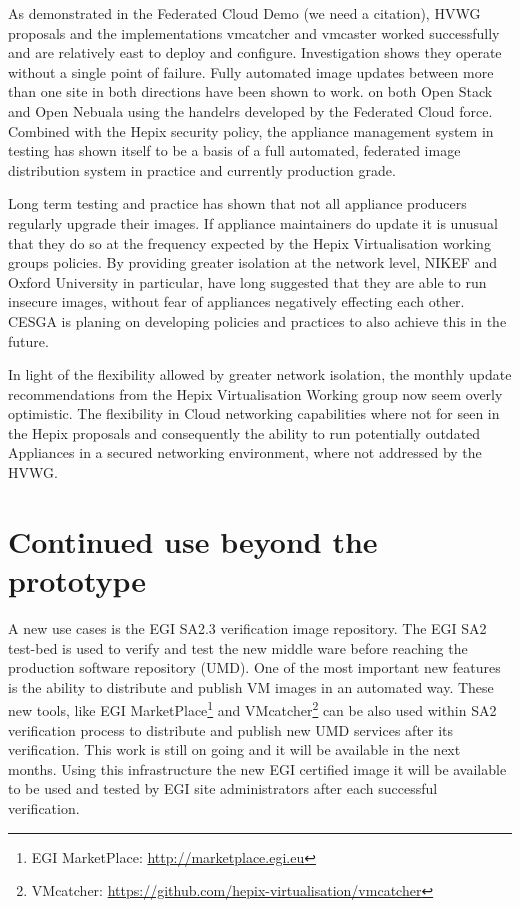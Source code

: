 \documentclass{llncs_Ibergrid2013}
\begin{document}
As demonstrated in the Federated Cloud Demo (we need a citation), HVWG proposals and the implementations vmcatcher and vmcaster worked successfully and are relatively east to deploy and configure. Investigation shows they operate without a single point of failure. Fully automated image updates between more than one site in both directions have been shown to work. on both Open Stack and Open Nebuala using the handelrs developed by the Federated Cloud force. Combined with the Hepix security policy, the appliance management system in testing has shown itself to be a basis of a full automated, federated image distribution system in practice and currently production grade.

Long term testing and practice has shown that not all appliance producers regularly upgrade their images. If appliance maintainers do update it is unusual that they do so at the frequency expected by the Hepix Virtualisation working groups policies. By providing greater isolation at the network level, NIKEF and Oxford University in particular, have long suggested that they are able to run insecure images, without fear of appliances negatively effecting each other. CESGA is planing on developing policies and practices to also achieve this in the future.

In light of the flexibility allowed by greater network isolation, the monthly update recommendations from the Hepix Virtualisation Working group now seem overly optimistic. The flexibility in Cloud networking capabilities where not for seen in the Hepix proposals and consequently the ability to run potentially outdated Appliances in a secured networking environment, where not addressed by the HVWG.

\section{Continued use beyond the prototype}
\label{sect-continued}

A new use cases is the EGI SA2.3 verification image repository. The EGI SA2 test-bed is used to verify and test the new middle ware before reaching the production software repository (UMD).
One of the most important new features is the ability to distribute and publish VM images in an automated way. 
These new tools, like EGI MarketPlace\footnote{EGI MarketPlace: \url{http://marketplace.egi.eu}} and VMcatcher\footnote{VMcatcher: \url{https://github.com/hepix-virtualisation/vmcatcher}} can be also used within SA2 verification process to distribute and publish new UMD services after its verification. 
This work is still on going and it will be available in the next months. Using this infrastructure the new EGI certified image it will be available to be used and tested by EGI site administrators after each successful verification.
\end{document}
